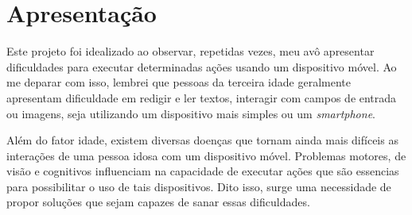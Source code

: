 \documentclass[
	12pt,				    %
	openright,			    %
	oneside,			    %
	a4paper,			    %
    sumario=tradicional,    %
	english,			    %
	brazil,				    %
	]{abntex2}              %
\begin{document}








\tableofcontents*
\cleardoublepage

\textual


\chapter{Apresentação}\label{sec:apresentacao}

		Este projeto foi idealizado ao observar, repetidas vezes, meu avô apresentar dificuldades para executar determinadas ações usando um dispositivo móvel. Ao me deparar com isso, lembrei que pessoas da terceira idade geralmente apresentam dificuldade em redigir e ler textos, interagir com campos de entrada ou imagens, seja utilizando um dispositivo mais simples ou um \textit{smartphone}.

\par

Além do fator idade, existem diversas doenças que tornam ainda mais difíceis as interações de uma pessoa idosa com um dispositivo móvel. Problemas motores, de visão e cognitivos influenciam na capacidade de executar ações que são essencias para possibilitar o uso de tais dispositivos. Dito isso, surge uma necessidade de propor soluções que sejam capazes de sanar essas dificuldades.
\end{document}
